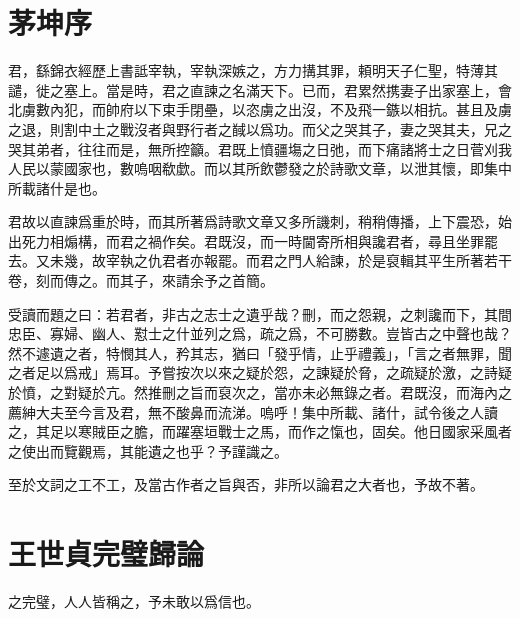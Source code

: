 \theendnotes

\section[青霞先生文集序\quad{\small 茅坤}]{{\normalsize 茅坤}\quad {}序}
君，繇錦衣經歷上書詆宰執，宰執深嫉之，方力搆其罪，頼明天子仁聖，特薄其譴，徙之塞上。當是時，君之直諫之名滿天下。已而，君累然携妻子出家塞上，會北{虜}數內犯，而帥府以下束手閉壘，以恣虜之出沒，不及飛一鏃以相抗。甚且及虜之退，則割中土之戰沒者與野行者之馘以爲功。而父之哭其子，妻之哭其夫，兄之哭其弟者，往往而是，無所控籲。君既上憤疆塲之日弛，而下痛諸將士之日菅刈我人民以蒙國家也，數嗚咽欷歔。而以其所{飲}鬱發之於詩歌文章，以泄其懷，即集中所載諸什是也。%

君故以直諫爲重於時，而其所著爲詩歌文章又多所譏刺，稍稍傳播，上下震恐，始出死力相煽構，而君之禍作矣。君既沒，而一時閫寄所相與讒君者，尋且坐罪罷去。又未幾，故宰執之仇君者亦報罷。而君之門人給諫，於是裒輯其平生所著若干卷，刻而傳之。而其子，來請余予之首簡。

受讀而題之曰：若君者，非古之志士之遺乎哉？刪，而之怨親，之刺讒而下，其間忠臣、寡婦、幽人、懟士之什並列之爲，疏之爲，不可勝數。豈皆古之中聲也哉？然不遽遺之者，特憫其人，矜其志，猶曰「發乎情，止乎禮義」，「言之者無罪，聞之者足以爲戒」焉耳。予嘗按次以來之疑於怨，之諫疑於脅，之疏疑於激，之詩疑於憤，之對疑於亢。然推刪之旨而裒次之，當亦未必無錄之者。君既沒，而海內之薦紳大夫至今言及君，無不酸鼻而流涕。嗚呼！集中所載、諸什，試令後之人讀之，其足以寒賊臣之膽，而躍塞垣戰士之馬，而作之愾也，固矣。他日國家采風者之使出而覽觀焉，其能遺之也乎？予謹識之。

至於文詞之工不工，及當古作者之旨與否，非所以論君之大者也，予故不著。%

\theendnotes

\section[藺相如完璧歸趙論\quad{\small 王世貞}]{{\normalsize 王世貞}\quad {}完璧歸論}
之完璧，人人皆稱之，予未敢以爲信也。%

